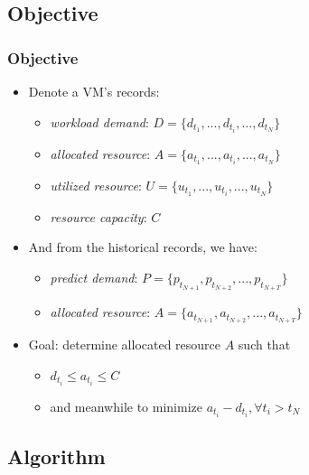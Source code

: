 \documentclass{beamer}
\begin{document}
\subsection{Objective}
	\begin{frame}
	\frametitle{Objective}
		\begin{itemize}
		\item Denote a VM's records:
			\begin{itemize}
			\item {\it workload demand}: $D=\{d_{t_{1}},...,d_{t_{i}},...,d_{t_{N}}\}$
			\item {\it allocated resource}: $A=\{a_{t_{1}},...,a_{t_{i}},...,a_{t_{N}}\}$
			\item {\it utilized resource}: $U=\{u_{t_{1}},...,u_{t_{i}},...,u_{t_{N}}\}$
			\item {\it resource capacity}: $C$
			\end{itemize}
		\item And from the historical records, we have:
			\begin{itemize}
			\item {\it predict demand}: $P=\{p_{t_{N+1}},p_{t_{N+2}},...,p_{t_{N+T}}\}$
			\item {\it allocated resource}: $A=\{a_{t_{N+1}},a_{t_{N+2}},...,a_{t_{N+T}}\}$
			\end{itemize}
		\item Goal: determine allocated resource $A$ such that
			\begin{itemize}
			\item $d_{t_{i}} \leq a_{t_{i}} \leq C$
			\item and meanwhile to minimize $a_{t_{i}}-d_{t_{i}}, \forall t_{i} > t_{N}$
			\end{itemize}
		\end{itemize}
	\end{frame}

\subsection{Algorithm}
\end{document}
